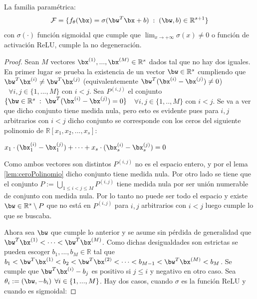 \begin{prop} \label{prop:1}
La familia paramétrica:  
\begin{equation}
\mathcal{F} =  \{f_\theta(\textnormal{\bx}) = \sigma (\textnormal{\bw}^T\textnormal{\bx} + b) \; : \; (\textnormal{\bw},b)\in\mathbb{R}^{s+1} \}
\end{equation}
con $\sigma(\cdot)$ función sigmoidal que cumple que $\lim_{x \to +\infty} \sigma(x) \neq 0$ o función de activación ReLU, cumple la no degeneración.
\end{prop}

\begin{proof}
Sean $M$ vectores $\bx^{(1)},... ,\bx^{(M)}\in \mathbb{R}^s$ dados tal que no hay dos iguales. En primer lugar se prueba la existencia de un vector $\bw\in\mathbb{R}^s$ cumpliendo que $\bw^T \bx^{(i)} \neq \bw^T \bx^{(j)}$ (equivalentemente $\bw^T(\bx^{(i)}-\bx^{(j)})\neq 0$) $\:\:\: \forall i,j \in \{1,..., M\}$ con $i<j$. Sea $P^{(i,j)}$ el conjunto  $\{\bw \in \mathbb{R}^s \; : \; \bw^T(\bx^{(i)}-\bx^{(j)})=0\}$ $\:\:\: \forall i,j \in \{1,.., M\}$ con $i<j$. Se va a ver que dicho conjunto tiene medida nula, pero esto es evidente pues para $i,j$ arbitrarios con $i < j$ dicho conjunto se corresponde con los ceros del siguiente polinomio de $\mathbb{R}[x_1,x_2,... ,x_s]$:  
\begin{center}

$x_1 \cdot (\bx^{(i)}_1 - \bx^{(j)}_1) + \cdots  + x_s \cdot (\bx^{(i)}_s - \bx^{(j)}_s) = 0$

\end{center}

Como ambos vectores son distintos $P^{(i,j)}$ no es el espacio entero, y por el lema \ref{lem:ceroPolinomio} dicho conjunto tiene medida nula. Por otro lado se tiene que el conjunto $P := \bigcup_{1\leq i < j \leq M} P^{(i,j)}$ tiene medida nula por ser unión numerable de conjunto con medida nula. Por lo tanto no puede ser todo el espacio y existe $\bw\in\mathbb{R}^s \setminus P$ que  no está en $P^{(i,j)}$ para $i,j$ arbitrarios con $i < j$ luego cumple lo que se buscaba.

Ahora sea $\bw$ que cumple lo anterior y se asume sin pérdida de generalidad que $\bw^T\bx^{(1)} < \cdots  < \bw^T\bx^{(M)}$. Como dichas desigualdades son estrictas se pueden escoger $b_1,... ,b_M\in\mathbb{R}$ tal que $ b_1 < \bw^T\bx^{(1)} < b_2 < \bw^T\bx^{(2)} <  \cdots  < b_{M-1} < \bw^T\bx^{(M)} < b_M $. Se cumple que $\bw^T\bx^{(i)}-b_j$ es positivo si $j\leq i$ y negativo en otro caso. Sea $\theta_i:=(\bw,-b_i) \: \: \forall i \in \{1,...,M\}$. Hay dos casos, cuando $\sigma$ es la función ReLU y cuando es sigmoidal:


\end{proof}
